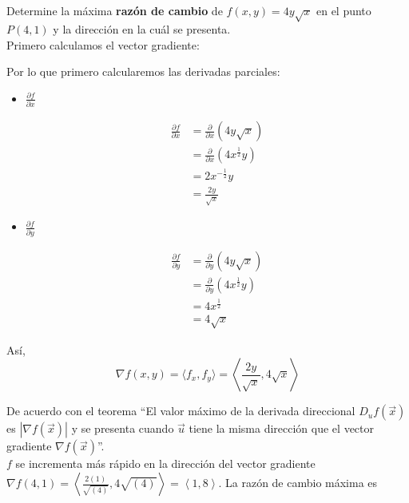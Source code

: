 \documentclass[12pt]{article}
\begin{document}
\section{}

Determine la máxima \textbf{razón de cambio} de $f(x, y) = 4y\sqrt{x}$ en el punto $P(4, 1)$ y la dirección en la cuál se presenta. \\

Primero calculamos el vector gradiente:

Por lo que primero calcularemos las derivadas parciales:

\begin{itemize}
  
\item $\frac{\partial f}{\partial x}$

  \begin{align*}
    \frac{\partial f}{\partial x}
    &= \frac{\partial}{\partial x}( 4y\sqrt{x})\\
    &= \frac{\partial}{\partial x}( 4x^{\frac{1}{2}}y)\\
    &= 2x^{-\frac{1}{2}}y \\
    &= \frac{2y}{\sqrt{x}}
  \end{align*}
  
\item $\frac{\partial f}{\partial y}$

  \begin{align*}
    \frac{\partial f}{\partial y}
    &= \frac{\partial}{\partial y}(4y\sqrt{x})\\
    &= \frac{\partial}{\partial y}( 4x^{\frac{1}{2}}y)\\
    &= 4x^{\frac{1}{2}} \\
    &= 4\sqrt{x}
  \end{align*}
  
\end{itemize}

Así, $$\nabla f(x,y) = \langle f_x, f_y \rangle = \left\langle  \frac{2y}{\sqrt{x}}, 4\sqrt{x} \right\rangle$$

De acuerdo con el teorema ``El valor máximo de la derivada direccional $D_u f (\vec{x})$ es $|\nabla f (\vec{x})|$ y se presenta cuando $\vec{u}$ tiene la misma dirección que el vector gradiente $\nabla f (\vec{x})$''. \\

$f$ se incrementa más rápido en la dirección del vector gradiente $\nabla f(4,1) = \left\langle  \frac{2(1)}{\sqrt{(4)}}, 4\sqrt{(4)} \right\rangle = \left\langle  1,8 \right\rangle$. La razón de cambio máxima es
\end{document}
